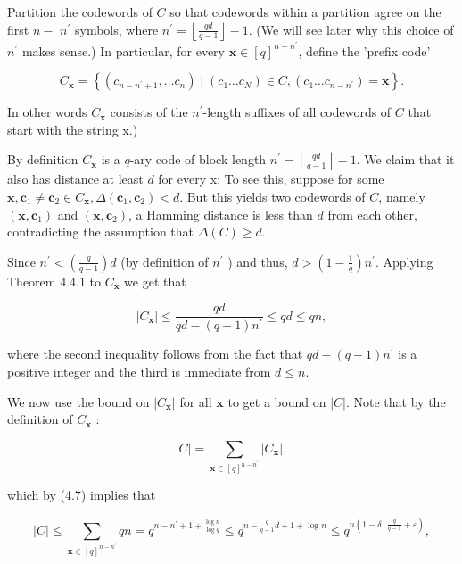 \documentclass[10pt]{article}
\begin{document}
Partition the codewords of $C$ so that codewords within a partition agree on the first $n-$ $n^{\prime}$ symbols, where $n^{\prime}=\left\lfloor\frac{q d}{q-1}\right\rfloor-1$. (We will see later why this choice of $n^{\prime}$ makes sense.) In particular, for every $\mathbf{x} \in[q]^{n-n^{\prime}}$, define the 'prefix code'

$$
C_{\mathbf{x}}=\left\{\left(c_{n-n^{\prime}+1}, \ldots c_{n}\right) \mid\left(c_{1} \ldots c_{N}\right) \in C,\left(c_{1} \ldots c_{n-n^{\prime}}\right)=\mathbf{x}\right\} .
$$

In other words $C_{\mathbf{x}}$ consists of the $n^{\prime}$-length suffixes of all codewords of $C$ that start with the string x.)

By definition $C_{\mathbf{x}}$ is a $q$-ary code of block length $n^{\prime}=\left\lfloor\frac{q d}{q-1}\right\rfloor-1$. We claim that it also has distance at least $d$ for every x: To see this, suppose for some $\mathbf{x}, \mathbf{c}_{1} \neq \mathbf{c}_{2} \in C_{\mathbf{x}}, \Delta\left(\mathbf{c}_{1}, \mathbf{c}_{2}\right)<d$. But this yields two codewords of $C$, namely $\left(\mathbf{x}, \mathbf{c}_{1}\right)$ and $\left(\mathbf{x}, \mathbf{c}_{2}\right)$, a Hamming distance is less than $d$ from each other, contradicting the assumption that $\Delta(C) \geq d$.

Since $n^{\prime}<\left(\frac{q}{q-1}\right) d$ (by definition of $n^{\prime}$ ) and thus, $d>\left(1-\frac{1}{q}\right) n^{\prime}$. Applying Theorem 4.4.1 to $C_{\mathbf{x}}$ we get that


\begin{equation*}
\left|C_{\mathbf{x}}\right| \leq \frac{q d}{q d-(q-1) n^{\prime}} \leq q d \leq q n, \tag{4.7}
\end{equation*}


where the second inequality follows from the fact that $q d-(q-1) n^{\prime}$ is a positive integer and the third is immediate from $d \leq n$.

We now use the bound on $\left|C_{\mathbf{x}}\right|$ for all $\mathbf{x}$ to get a bound on $|C|$. Note that by the definition of $C_{\mathbf{x}}$ :

$$
|C|=\sum_{\mathbf{x} \in[q]^{n-n^{\prime}}}\left|C_{\mathbf{x}}\right|,
$$

which by (4.7) implies that

$$
|C| \leq \sum_{\mathbf{x} \in[q]^{n-n^{\prime}}} q n=q^{n-n^{\prime}+1+\frac{\log n}{\log q}} \leq q^{n-\frac{q}{q-1} d+1+\log n} \leq q^{n\left(1-\delta \cdot \frac{q}{q-1}+\varepsilon\right)},
$$
\end{document}

